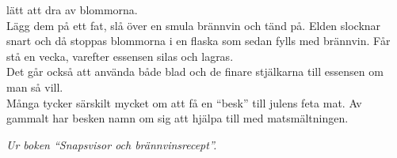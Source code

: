 lätt att dra av blommorna.\\
\hspace*{10pt}Lägg dem på ett fat, slå över en smula brännvin och 
tänd på. Elden slocknar snart och då stoppas blommorna i 
en flaska som sedan fylls med brännvin. Får stå en vecka, 
varefter essensen silas och lagras.\\
\hspace*{10pt}Det går också att använda både blad och de finare 
stjälkarna till essensen om man så vill.\\
\hspace*{10pt}Många tycker särskilt mycket om att få en ``besk'' 
till julens feta mat. Av gammalt har besken namn om sig 
att hjälpa till med matsmältningen.
\par\vspace{10pt}
{\footnotesize\textit{Ur boken ``Snapsvisor och brännvinsrecept''.}}
